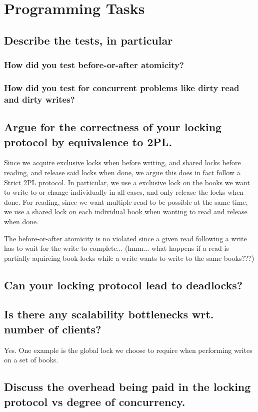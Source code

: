 
\section{Programming Tasks}

\subsection{Describe the tests, in particular}

\subsubsection{How did you test before-or-after atomicity?}

\subsubsection{How did you test for concurrent problems like dirty read and dirty writes?}

\subsection{Argue for the correctness of your locking protocol by equivalence to 2PL.}

Since we acquire exclusive locks when before writing, and shared locks before reading, and release said locks when done, we argue this does in fact follow a Strict 2PL protocol. In particular, we use a exclusive lock on the books we want to write to or change individually in all cases, and only release the locks when done. For reading, since we want multiple read to be possible at the same time, we use a shared lock on each individual book when wanting to read and release when done.

The before-or-after atomicity is no violated since a given read following a write has to wait for the write to complete... (hmm... what happens if a read is partially aquireing book locks while a write wants to write to the same books???)

\subsection{Can your locking protocol lead to deadlocks?}

\subsection{Is there any scalability bottlenecks wrt. number of clients?}

Yes. One example is the global lock we choose to require when performing writes on a set of books.

\subsection{Discuss the overhead being paid in the locking protocol vs degree of concurrency.}


